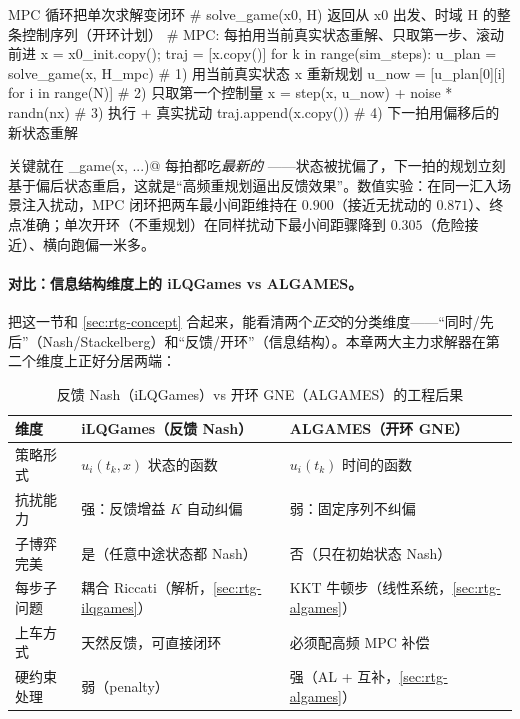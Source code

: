 \begin{codebox}[Python]{MPC 循环把单次求解变闭环}
# solve_game(x0, H) 返回从 x0 出发、时域 H 的整条控制序列（开环计划）
# MPC: 每拍用当前真实状态重解、只取第一步、滚动前进
x = x0_init.copy(); traj = [x.copy()]
for k in range(sim_steps):
    u_plan = solve_game(x, H_mpc)               # 1) 用当前真实状态 x 重新规划
    u_now  = [u_plan[0][i] for i in range(N)]   # 2) 只取第一个控制量
    x = step(x, u_now) + noise * randn(nx)      # 3) 执行 + 真实扰动
    traj.append(x.copy())                       # 4) 下一拍用偏移后的新状态重解
\end{codebox}

\noindent 关键就在 \verb@solve_game(x, ...)@ 每拍都吃\emph{最新的} \verb@x@——状态被扰偏了，下一拍的规划立刻基于偏后状态重启，这就是“高频重规划逼出反馈效果”。数值实验：在同一汇入场景注入扰动，MPC 闭环把两车最小间距维持在 $0.900$（接近无扰动的 $0.871$）、终点准确；单次开环（不重规划）在同样扰动下最小间距骤降到 $0.305$（危险接近）、横向跑偏一米多\cite{lecleach2022algames}。

\paragraph{对比：信息结构维度上的 iLQGames vs ALGAMES。}
把这一节和 \cref{sec:rtg-concept} 合起来，能看清两个\emph{正交}的分类维度——“同时/先后”（Nash/Stackelberg）和“反馈/开环”（信息结构）。本章两大主力求解器在第二个维度上正好分居两端：

\begin{table}[H]\centering\small
\caption{反馈 Nash（iLQGames）vs 开环 GNE（ALGAMES）的工程后果}
\label{tab:rtg-ilq-vs-alg-info}
\begin{tabular}{p{} p{} p{}}
\toprule
维度 & iLQGames（反馈 Nash） & ALGAMES（开环 GNE） \\
\midrule
策略形式 & $u_i(t_k,x)$ 状态的函数 & $u_i(t_k)$ 时间的函数 \\
抗扰能力 & 强：反馈增益 $K$ 自动纠偏 & 弱：固定序列不纠偏 \\
子博弈完美 & 是（任意中途状态都 Nash） & 否（只在初始状态 Nash） \\
每步子问题 & 耦合 Riccati（解析，\cref{sec:rtg-ilqgames}） & KKT 牛顿步（线性系统，\cref{sec:rtg-algames}） \\
上车方式 & 天然反馈，可直接闭环 & 必须配高频 MPC 补偿 \\
硬约束处理 & 弱（penalty） & 强（AL + 互补，\cref{sec:rtg-algames}） \\
\bottomrule
\end{tabular}
\end{table}

